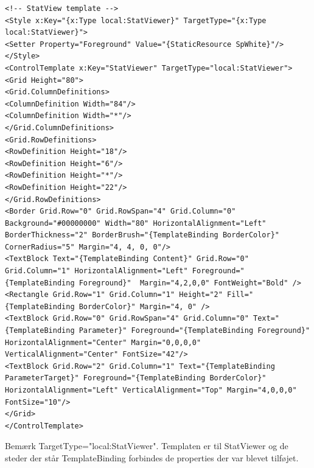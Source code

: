 \begin{lstlisting}[caption=StatViewerTheme, label=code:StatViewerTheme]
<!-- StatView template -->
<Style x:Key="{x:Type local:StatViewer}" TargetType="{x:Type local:StatViewer}">
<Setter Property="Foreground" Value="{StaticResource SpWhite}"/>
</Style>
<ControlTemplate x:Key="StatViewer" TargetType="local:StatViewer">
<Grid Height="80">
<Grid.ColumnDefinitions>
<ColumnDefinition Width="84"/>
<ColumnDefinition Width="*"/>
</Grid.ColumnDefinitions>
<Grid.RowDefinitions>
<RowDefinition Height="18"/>
<RowDefinition Height="6"/>
<RowDefinition Height="*"/>
<RowDefinition Height="22"/>
</Grid.RowDefinitions>
<Border Grid.Row="0" Grid.RowSpan="4" Grid.Column="0" Background="#00000000" Width="80" HorizontalAlignment="Left" BorderThickness="2" BorderBrush="{TemplateBinding BorderColor}" CornerRadius="5" Margin="4, 4, 0, 0"/>
<TextBlock Text="{TemplateBinding Content}" Grid.Row="0"  Grid.Column="1" HorizontalAlignment="Left" Foreground="{TemplateBinding Foreground}"  Margin="4,2,0,0" FontWeight="Bold" />
<Rectangle Grid.Row="1" Grid.Column="1" Height="2" Fill="{TemplateBinding BorderColor}" Margin="4, 0" />
<TextBlock Grid.Row="0" Grid.RowSpan="4" Grid.Column="0" Text="{TemplateBinding Parameter}" Foreground="{TemplateBinding Foreground}" HorizontalAlignment="Center" Margin="0,0,0,0" VerticalAlignment="Center" FontSize="42"/>
<TextBlock Grid.Row="2" Grid.Column="1" Text="{TemplateBinding ParameterTarget}" Foreground="{TemplateBinding BorderColor}" HorizontalAlignment="Left" VerticalAlignment="Top" Margin="4,0,0,0" FontSize="10"/>
</Grid>
</ControlTemplate>
\end{lstlisting}

Bemærk TargetType="local:StatViewer". Templaten er til StatViewer og de steder der står TemplateBinding forbindes de properties der var blevet tilføjet.

